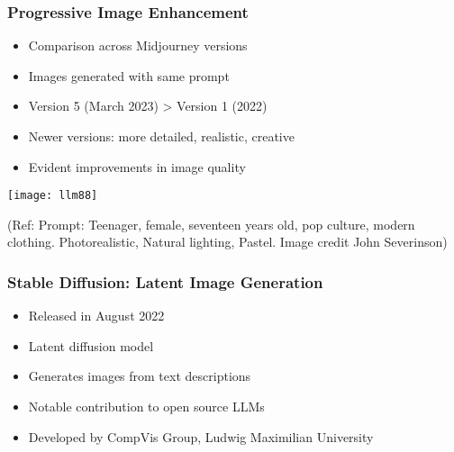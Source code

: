 \begin{frame}[fragile]\frametitle{Progressive Image Enhancement}
    
    \begin{itemize}
        \item Comparison across Midjourney versions
        \item Images generated with same prompt
        \item Version 5 (March 2023) > Version 1 (2022)
        \item Newer versions: more detailed, realistic, creative
        \item Evident improvements in image quality
    \end{itemize}
	
\begin{center}
\texttt{[image: llm88]}
\end{center}		

{\tiny (Ref: Prompt: Teenager, female, seventeen years old, pop culture, modern clothing. Photorealistic, Natural lighting, Pastel. Image credit John Severinson)}
		
\end{frame}


\begin{frame}[fragile]\frametitle{Stable Diffusion: Latent Image Generation}
    
    \begin{itemize}
        \item Released in August 2022
        \item Latent diffusion model
        \item Generates images from text descriptions
        \item Notable contribution to open source LLMs
        \item Developed by CompVis Group, Ludwig Maximilian University
    \end{itemize}

\end{frame}

